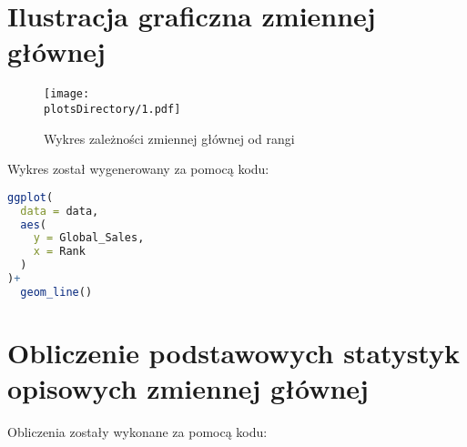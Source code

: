 	\section{Ilustracja graficzna zmiennej głównej}
	
	\begin{center}
	\begin{figure}[h!]
  	\texttt{[image: \\plotsDirectory/1.pdf]}
  	\caption{Wykres zależności zmiennej głównej od rangi}
	\end{figure}	
	\end{center}\vspace{1cm}Wykres został wygenerowany za pomocą kodu:
	\begin{lstlisting}[language=R]
ggplot(
  data = data,
  aes(
    y = Global_Sales,
    x = Rank 
  )
)+
  geom_line()
\end{lstlisting}
	\section{Obliczenie podstawowych statystyk opisowych zmiennej głównej}
	
Obliczenia zostały wykonane za pomocą kodu:
	
